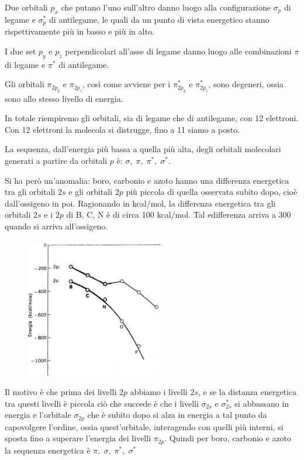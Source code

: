 Due orbitali $p_x$ che putano l'uno sull'altro danno luogo alla configurazione $\sigma_p$ di legame e $\sigma^*_p$ di antilegame, le quali da un punto di vista energetico stanno rispettivamente più in basso e più in alto.

I due set $p_y$ e $p_z$ perpendicolari all'asse di legame danno luogo alle combinazioni $\pi$ di legame e $\pi^*$ di antilegame.

Gli orbitali $\pi_{2p_y}$ e $\pi_{2p_z}$, così come avviene per i $\pi_{2p_y}^*$ e $\pi_{2p_z}^*$, sono degeneri, ossia sono allo stesso livello di energia.

In totale riempiremo gli orbitali, sia di legame che di antilegame, con 12 elettroni. Con 12 elettroni la molecola si distrugge, fino a 11 siamo a posto.

La sequenza, dall'energia più bassa a quella più alta, degli orbitali molecolari generati a partire da orbitali $p$ è: $\sigma, \; \pi, \; \pi^*, \; \sigma^*$.

Si ha però un'anomalia: boro, carbonio e azoto hanno una differenza energetica tra gli orbitali $2s$ e gli orbitali $2p$ più piccola di quella osservata subito dopo, cioè dall'ossigeno in poi. Ragionando in kcal/mol, la differenza energetica tra gli orbitali $2s$ e i $2p$ di B, C, N è di circa 100 kcal/mol. Tal edifferenza arriva a 300 quando si arriva all'ossigeno.

\begin{figure}[htp]
    \centering
    \includegraphics[width=6cm]{immagini/differenza_energia_2s_2p.png}
\end{figure}

Il motivo è che prima dei livelli $2p$ abbiamo i livelli $2s$, e se la distanza energetica tra questi livelli è piccola ciò che succede è che i livelli $\sigma_{2s}$ e $\sigma_{2s}^*$ si abbassano in energia e l'orbitale $\sigma_{2p}$ che è subito dopo si alza in energia a tal punto da capovolgere l'ordine, ossia quest'orbitale, interagendo con quelli più interni, si sposta fino a superare l'energia dei livelli $\pi_{2p}$. Quindi per boro, carbonio e azoto la sequenza energetica è $\pi,\; \sigma, \; \pi^*, \; \sigma^*$

